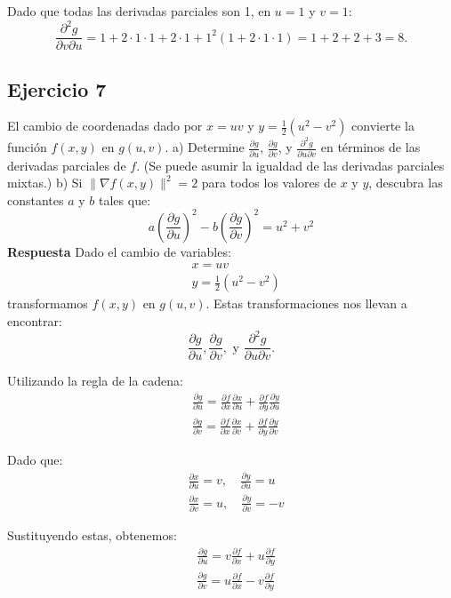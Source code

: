 \documentclass{report}
\begin{document}
    Dado que todas las derivadas parciales son 1, en \( u = 1 \) y \( v = 1 \):
    $$
    \frac{\partial^2 g}{\partial v \partial u} = 1 + 2 \cdot 1 \cdot 1 + 2 \cdot 1 + 1^2 (1 + 2 \cdot 1 \cdot 1) = 1 + 2 + 2 + 3 = 8.
    $$\subsection*{Ejercicio 7}
    El cambio de coordenadas dado por $x = uv$ y $y = \frac{1}{2}(u^2 - v^2)$ convierte la función $f(x,y)$ en $g(u,v)$. 
    a) Determine $\frac{\partial g}{\partial u}$, $\frac{\partial g}{\partial v}$, y $\frac{\partial^2 g}{\partial u \partial v}$ en términos de las derivadas parciales de $f$. (Se puede asumir la igualdad de las derivadas parciales mixtas.)
    b) Si $\|\nabla f(x,y)\|^2 = 2$ para todos los valores de $x$ y $y$, descubra las constantes $a$ y $b$ tales que:
    $$
    a\left(\frac{\partial g}{\partial u}\right)^2 - b\left(\frac{\partial g}{\partial v}\right)^2 = u^2 + v^2
    $$
    \textbf{Respuesta}
    Dado el cambio de variables:
    $$
    \begin{aligned}
    & x = uv \\
    & y = \frac{1}{2}(u^2 - v^2)
    \end{aligned}
    $$
    transformamos $f(x, y)$ en $g(u, v)$. Estas transformaciones nos llevan a encontrar:
    $$
    \frac{\partial g}{\partial u}, \frac{\partial g}{\partial v}, \text{ y } \frac{\partial^2 g}{\partial u \partial v}.
    $$

    Utilizando la regla de la cadena:
    $$
    \begin{aligned}
    & \frac{\partial g}{\partial u} = \frac{\partial f}{\partial x} \frac{\partial x}{\partial u} + \frac{\partial f}{\partial y} \frac{\partial y}{\partial u} \\
    & \frac{\partial g}{\partial v} = \frac{\partial f}{\partial x} \frac{\partial x}{\partial v} + \frac{\partial f}{\partial y} \frac{\partial y}{\partial v}
    \end{aligned}
    $$

    Dado que:
    $$
    \begin{aligned}
    & \frac{\partial x}{\partial u} = v, \quad \frac{\partial y}{\partial u} = u \\
    & \frac{\partial x}{\partial v} = u, \quad \frac{\partial y}{\partial v} = -v
    \end{aligned}
    $$

    Sustituyendo estas, obtenemos:
    $$
    \begin{aligned}
    & \frac{\partial g}{\partial u} = v \frac{\partial f}{\partial x} + u \frac{\partial f}{\partial y} \\
    & \frac{\partial g}{\partial v} = u \frac{\partial f}{\partial x} - v \frac{\partial f}{\partial y}
    \end{aligned}
    $$
\end{document}
